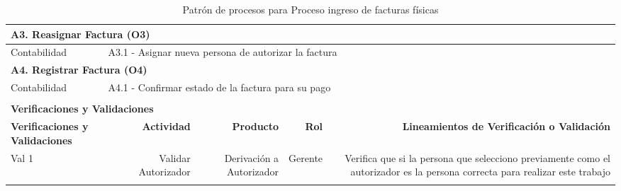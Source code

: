 \begin{longtable}{|llrrrrrr|}
    \multicolumn{8}{|l|}{\textbf{A3. Reasignar Factura (O3)}} \\ \hline
    Contabilidad & \multicolumn{7}{|l|}{A3.1 - Asignar nueva persona de autorizar la factura} \\ \hline
    
    \multicolumn{8}{|l|}{\textbf{A4. Registrar Factura (O4)}} \\ \hline
    Contabilidad & \multicolumn{7}{|l|}{A4.1 - Confirmar estado de la factura para su pago} \\ \hline

     & & & & & & & \\ \hline
	\multicolumn{8}{|l|}{\textbf{Verificaciones y Validaciones}} \\ \hline
	\multicolumn{2}{|m{3cm}|}{\textbf{Verificaciones y Validaciones}} & \multicolumn{1}{m{2cm}|}{\textbf{Actividad}} & \multicolumn{1}{m{2,2cm}|}{\textbf{Producto}} & \multicolumn{1}{m{1.5cm}|}{\textbf{Rol}} &\multicolumn{3}{m{4cm}|}{\textbf{Lineamientos de Verificación o Validación}} \\ \hline

	\multicolumn{2}{|m{3cm}|}{Val 1} & \multicolumn{1}{m{2cm}|}{Validar Autorizador} & \multicolumn{1}{m{2.2cm}|}{Derivación a Autorizador} & \multicolumn{1}{m{2cm}|}{Gerente} & \multicolumn{3}{m{4cm}|}{Verifica que si la persona que selecciono previamente como el autorizador es la persona correcta para realizar este trabajo} \\ \hline
	
	\caption{Patrón de procesos para Proceso ingreso de facturas físicas}
\end{longtable}

